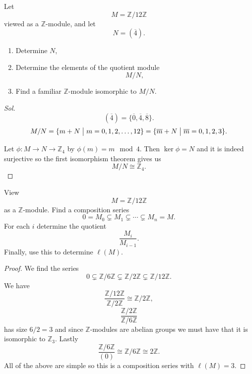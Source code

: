 \documentclass[11pt]{article}
\begin{document}
\begin{prob}
    Let 
    \[
        M = \mathbb Z/12\mathbb Z
    \]
    viewed as a $\mathbb Z$-module, and let 
    \[
        N = (\overline 4). 
    \]
    \begin{enumerate}
        \item Determine $N$, 
        \item Determine the elements of the quotient module 
            \[
                M/N,
            \]
        \item Find a familiar $\mathbb Z$-module isomorphic 
            to $M/N$.
    \end{enumerate}
\end{prob}
\begin{proof}[Sol]
    \[
        (\overline 4) = \{\overline 0,\overline 4,\overline 8\}. 
    \]
    \[
        M/N = \{m + N \bigm| m = 0,1,2,\ldots,12\} 
        = \{\overline m + N \bigm| \overline m = 0,1,2,3\}. 
    \]

    Let $\phi : M \to N \to \mathbb Z_4$ by 
    $\phi(m) = m \mod 4$. Then $\ker \phi = N$ and it is 
    indeed surjective so the first isomorphism theorem gives us 
    \[
        M/N \cong \mathbb Z_4. 
    \]
\end{proof}

\begin{prob}
    View 
    \[
        M = \mathbb Z/12\mathbb Z
    \]
    as a $\mathbb Z$-module. 
    Find a composition series 
    \[
        0 = M_0 \subsetneq M_1 \subsetneq \cdots \subsetneq M_n = M.
    \]
    For each $i$ determine the quotient 
    \[
        \frac{M_i}{M_{i-1}}.
    \]
    Finally, use this to determine $\ell(M)$.
\end{prob}
\begin{proof}
    We find the series 
    \[
        0 \subsetneq \mathbb Z/6\mathbb Z \subsetneq 
        \mathbb Z/2\mathbb Z \subsetneq \mathbb Z/12\mathbb Z.
    \]
    We have 
    \[
        \frac{\mathbb Z/12\mathbb Z}{\mathbb Z/2\mathbb Z}
        \cong \mathbb Z/2\mathbb Z, 
    \]
    \[
        \frac{\mathbb Z/2\mathbb Z}{\mathbb Z/6\mathbb Z} 
    \]
    has size $6/2 = 3$ and since $\mathbb Z$-modules are abelian 
    groups we must have that it is isomorphic to $\mathbb Z_3$. 
    Lastly 
    \[
        \frac{\mathbb Z/6\mathbb Z}{(0)} \cong \mathbb Z/6\mathbb Z 
        \cong 2 \mathbb Z.
    \]
    All of the above are simple so this is a composition series 
    with $\ell(M) = 3$. 
\end{proof}
\end{document}
